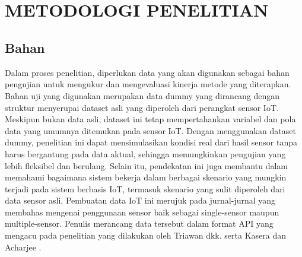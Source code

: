 \chapter[METODOLOGI PENELITIAN]{\\ METODOLOGI PENELITIAN}
\section{Bahan}
Dalam proses penelitian, diperlukan data yang akan digunakan sebagai bahan pengujian untuk mengukur dan mengevaluasi kinerja metode yang diterapkan. Bahan uji yang digunakan merupakan data dummy yang dirancang dengan struktur menyerupai dataset asli yang diperoleh dari perangkat sensor IoT. Meskipun bukan data asli, dataset ini tetap mempertahankan variabel dan pola data yang umumnya ditemukan pada sensor IoT. Dengan menggunakan dataset dummy, penelitian ini dapat mensimulasikan kondisi real dari hasil sensor tanpa harus bergantung pada data aktual, sehingga memungkinkan pengujian yang lebih fleksibel dan berulang. Selain itu, pendekatan ini juga membantu dalam memahami bagaimana sistem bekerja dalam berbagai skenario yang mungkin terjadi pada sistem berbasis IoT, termasuk skenario yang sulit diperoleh dari data sensor asli. Pembuatan data IoT ini merujuk pada jurnal-jurnal yang membahas mengenai penggunaan sensor baik sebagai single-sensor maupun multiple-sensor. Penulis merancang data tersebut dalam format API yang mengacu pada penelitian yang dilakukan oleh Triawan dkk. \cite{Triawan2023} serta Kasera dan Acharjee \cite{Kasera2024}. 


